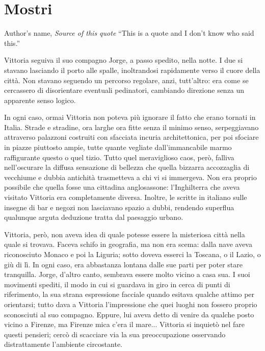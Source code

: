 \chapter{Mostri}

\begin{chapquote}{Author's name, \textit{Source of this quote}}
``This is a quote and I don't know who said this.''
\end{chapquote}


Vittoria seguiva il suo compagno Jorge, a passo spedito, nella notte. I due si stavano lasciando il porto alle spalle, inoltrandosi rapidamente verso il cuore della città. Non stavano seguendo un percorso regolare, anzi, tutt'altro: era come se cercassero di disorientare eventuali pedinatori, cambiando direzione senza un apparente senso logico.

In ogni caso, ormai Vittoria non poteva più ignorare il fatto che erano tornati in Italia. Strade e stradine, ora larghe ora fitte senza il minimo senso, serpeggiavano attraverso palazzoni costruiti con sfacciata incuria architettonica, per poi sfociare in piazze piuttosto ampie, tutte quante vegliate dall'immancabile marmo raffigurante questo o quel tizio. Tutto quel meraviglioso caos, però, falliva nell'oscurare la diffusa sensazione di bellezza che quella bizzarra accozzaglia di vecchiume e dubbia antichità trasmetteva a chi vi si immergeva. Non era proprio possibile che quella fosse una cittadina anglosassone: l'Inghilterra che aveva visitato Vittoria era completamente diversa. Inoltre, le scritte in italiano sulle insegne di bar e negozi non lasciavano spazio a dubbi, rendendo superflua qualunque arguta deduzione tratta dal paesaggio urbano. 

Vittoria, però, non aveva idea di quale potesse essere la misteriosa città nella quale si trovava. Faceva schifo in geografia, ma non era scema: dalla nave aveva riconosciuto Monaco e poi la Liguria; sotto doveva esserci la Toscana, o il Lazio, o giù di lì. In ogni caso, era abbastanza lontana dalle sue parti per poter stare tranquilla. Jorge, d'altro canto, sembrava essere molto vicino a casa sua. I suoi movimenti spediti, il modo in cui si guardava in giro in cerca di punti di riferimento, la sua strana espressione facciale quando esitava qualche attimo per orientarsi; tutto dava a Vittoria l'impressione che quei luoghi non fossero proprio sconosciuti al suo compagno. Eppure, lui aveva detto di venire da qualche posto vicino a Firenze, ma Firenze mica c'era il mare... Vittoria si inquietò nel fare questi pensieri; cercò di scacciare via la sua preoccupazione osservando distrattamente l'ambiente circostante.

